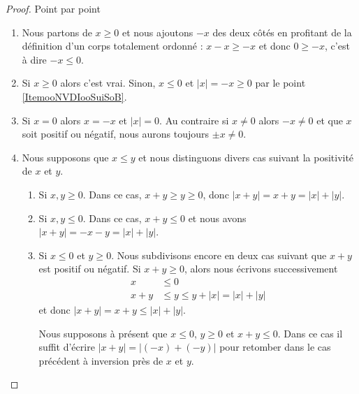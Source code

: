\begin{proof}
    Point par point
    \begin{enumerate}
        \item
            Nous partons de \( x\geq 0\) et nous ajoutons \( -x\) des deux côtés en profitant de la définition d'un corps totalement ordonné : \( x-x\geq -x\) et donc \( 0\geq-x\), c'est à dire \( -x\leq 0\).
        \item
            Si \( x\geq 0\) alors c'est vrai. Sinon, \( x\leq 0\) et \( | x |=-x\geq 0\) par le point \ref{ItemooNVDIooSuiSoB}.
        \item
            Si \( x=0\) alors \( x=-x\) et \( | x |=0\). Au contraire si \(x\neq 0\) alors \( -x\neq 0\) et que \( x\) soit positif ou négatif, nous aurons toujours \( \pm x\neq 0\).
        \item
            Nous supposons que \( x\leq y\) et nous distinguons divers cas suivant la positivité de \( x\) et \( y\).
            \begin{enumerate}
                \item
                    Si \( x,y\geq 0\). Dans ce cas, \( x+y\geq y\geq 0\), donc \( | x+y |=x+y=| x |+| y |\).
                \item
                    Si \( x,y\leq 0\). Dans ce cas, \( x+y\leq 0\) et nous avons \( | x+y |=-x-y=| x |+| y |\).
                \item
                    Si \( x\leq 0\) et \( y\geq 0\). Nous subdivisons encore en deux cas suivant que \( x+y\) est positif ou négatif. Si \( x+y\geq 0\), alors nous écrivons successivement
                    \begin{subequations}
                        \begin{align}
                            x&\leq 0\\
                            x+y&\leq y\leq y+| x |=| x |+| y |
                        \end{align}
                    \end{subequations}
                    et donc \( | x+y |=x+y\leq | x |+| y |\).

                    Nous supposons à présent que \( x\leq 0\), \( y\geq 0\) et \( x+y\leq 0\). Dans ce cas il suffit d'écrire \( | x+y |=| (-x)+(-y) |\) pour retomber dans le cas précédent à inversion près de \( x\) et \( y\).
            \end{enumerate}
    \end{enumerate}
\end{proof}

